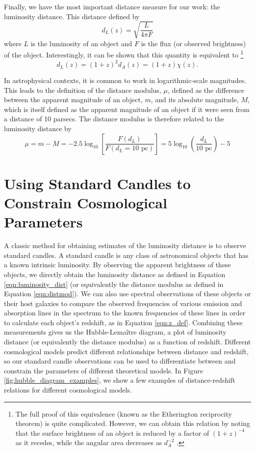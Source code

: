Finally, we have the most important distance measure for our work: the luminosity distance. This distance defined by
\begin{equation}
    d_L(z) = \sqrt{\frac{L}{4\pi F}}
    \label{eqn:luminosity_dist}
\end{equation}
where $L$ is the luminosity of an object and $F$ is the flux (or observed brightness) of the object. Interestingly, it can be shown that this quantity is equivalent to \footnote{The full proof of this equivalence (known as the Etherington reciprocity theorem) is quite complicated. However, we can obtain this relation by noting that the surface brightness of an object is reduced by a factor of $(1+z)^{-4}$ as it recedes, while the angular area decreases as $d_A^{-2}$ \cite{hogg_distance_1999}.}
\begin{equation}
    d_L(z) = (1+z)^2 d_A(z) = (1+z)\chi(z).
    \label{eqn:luminosity_dist_z}
\end{equation}


In astrophysical contexts, it is common to work in logarithmic-scale magnitudes. This leads to the definition of the distance modulus, $\mu$, defined as the difference between the apparent magnitude of an object, $m$, and its absolute magnitude, $M$, which is itself defined as the apparent magnitude of an object if it were seen from a distance of 10 parsecs. The distance modulus is therefore related to the luminosity distance by
\begin{equation}
    \mu = m - M
    = -2.5 \log_{10}\left[\frac{F(d_L)}{F(d_L = 10\textrm{ pc})}\right] = 5 \log_{10}\left(\frac{d_L}{10\textrm{ pc}}\right) - 5
    \label{eqn:distmod}
\end{equation}

\section{Using Standard Candles to Constrain Cosmological Parameters}
A classic method for obtaining estimates of the luminosity distance is to observe standard candles. A standard candle is any class of astronomical objects that has a known intrinsic luminosity. By observing the apparent brightness of these objects, we directly obtain the luminosity distance as defined in Equation \ref{eqn:luminosity_dist} (or equivalently the distance modulus as defined in Equation \ref{eqn:distmod}). We can also use spectral observations of these objects or their host galaxies to compare the observed frequencies of various emission and absorption lines in the spectrum to the known frequencies of these lines in order to calculate each object's redshift, as in Equation \ref{eqn:z_def}. Combining these measurements gives us the Hubble-Lema\^{i}tre diagram, a plot of luminosity distance (or equivalently the distance modulus) as a function of redshift. Different cosmological models predict different relationships between distance and redshift, so our standard candle observations can be used to differentiate between and constrain the parameters of different theoretical models. In Figure \ref{fig:hubble_diagram_examples}, we show a few examples of distance-redshift relations for different cosmological models.

